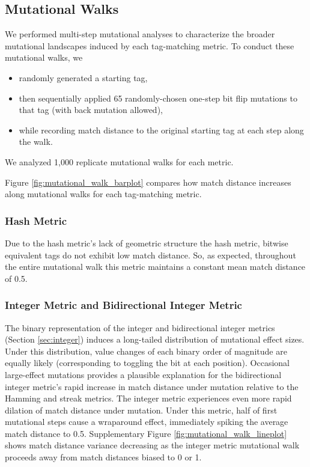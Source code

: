 \subsection{Mutational Walks} \label{sec:mutational_walks}



We performed multi-step mutational analyses to characterize the broader mutational landscapes induced by each tag-matching metric.
To conduct these mutational walks, we
\begin{itemize}
    \item randomly generated a starting tag,
    \item then sequentially applied 65 randomly-chosen one-step bit flip mutations to that tag (with back mutation allowed),
    \item while recording match distance to the original starting tag at each step along the walk.
\end{itemize}
We analyzed 1,000 replicate mutational walks for each metric.

Figure \ref{fig:mutational_walk_barplot} compares how match distance increases along mutational walks for each tag-matching metric.

\subsubsection{Hash Metric}

Due to the hash metric's lack of geometric structure the hash metric, bitwise equivalent tags do not exhibit low match distance.
So, as expected, throughout the entire mutational walk this metric maintains a constant mean match distance of 0.5.

\subsubsection{Integer Metric and Bidirectional Integer Metric}
\label{sec:mutation_integer}

The binary representation of the integer and bidirectional integer metrics (Section \ref{sec:integer}) induces a long-tailed distribution of mutational effect sizes.
Under this distribution, value changes of each binary order of magnitude are equally likely (corresponding to toggling the bit at each position).
Occasional large-effect mutations provides a plausible explanation for the bidirectional integer metric's rapid increase in match distance under mutation relative to the Hamming and streak metrics.
The integer metric experiences even more rapid dilation of match distance under mutation.
Under this metric, half of first mutational steps cause a wraparound effect, immediately spiking the average match distance to 0.5.
Supplementary Figure \ref{fig:mutational_walk_lineplot} shows match distance variance decreasing as the integer metric mutational walk proceeds away from match distances biased to 0 or 1.

